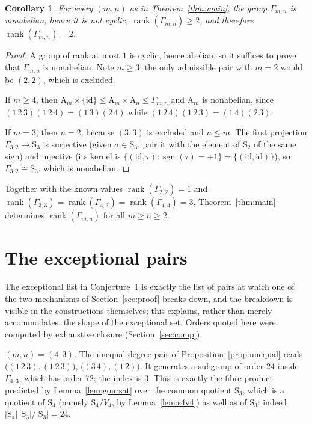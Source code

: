 \documentclass[11pt]{article}
\theoremstyle{plain}
\newtheorem{corollary}[theorem]{Corollary}
\theoremstyle{definition}
\theoremstyle{remark}
\numberwithin{equation}{section}
\newcommand{\Sym}{\mathrm{S}}
\newcommand{\Alt}{\mathrm{A}}
\newcommand{\Gam}{\Gamma}
\DeclareMathOperator{\sgn}{sgn}
\DeclareMathOperator{\rank}{rank}
\begin{document}
\begin{corollary}
\label{cor:rank}
For every $(m,n)$ as in Theorem~\ref{thm:main}, the group $\Gam_{m,n}$ is nonabelian; hence it is
not cyclic, $\rank(\Gam_{m,n}) \ge 2$, and therefore $\rank(\Gam_{m,n}) = 2$.
\end{corollary}

\begin{proof}
A group of rank at most $1$ is cyclic, hence abelian, so it suffices to prove that $\Gam_{m,n}$
is nonabelian. Note $m \ge 3$: the only admissible pair with $m = 2$ would be $(2,2)$, which is
excluded.

If $m \ge 4$, then $\Alt_m \times \{\mathrm{id}\} \le \Alt_m\times\Alt_n \le \Gam_{m,n}$ and
$\Alt_m$ is nonabelian, since $(1\,2\,3)(1\,2\,4) = (1\,3)(2\,4)$ while
$(1\,2\,4)(1\,2\,3) = (1\,4)(2\,3)$.

If $m = 3$, then $n = 2$, because $(3,3)$ is excluded and $n \le m$. The first projection
$\Gam_{3,2} \to \Sym_3$ is surjective (given $\sigma \in \Sym_3$, pair it with the element of
$\Sym_2$ of the same sign) and injective (its kernel is $\{(\mathrm{id},\tau) : \sgn(\tau) = +1\}
= \{(\mathrm{id},\mathrm{id})\}$), so $\Gam_{3,2} \cong \Sym_3$, which is nonabelian.
\end{proof}

Together with the known values $\rank(\Gam_{2,2}) = 1$ and
$\rank(\Gam_{3,3}) = \rank(\Gam_{4,3}) = \rank(\Gam_{4,4}) = 3$, Theorem~\ref{thm:main}
determines $\rank(\Gam_{m,n})$ for all $m \ge n \ge 2$.

\section{The exceptional pairs}
\label{sec:exceptions}

The exceptional list in Conjecture~1 is exactly the list of pairs at which one of the two
mechanisms of Section~\ref{sec:proof} breaks down, and the breakdown is visible in the
constructions themselves; this explains, rather than merely accommodates, the shape of the
exceptional set. Orders quoted here were computed by exhaustive closure
(Section~\ref{sec:comp}).

\emph{$(m,n) = (4,3)$.} The unequal-degree pair of Proposition~\ref{prop:unequal} reads
$\bigl((1\,2\,3),(1\,2\,3)\bigr)$, $\bigl((3\,4),(1\,2)\bigr)$. It generates a subgroup of order
$24$ inside $\Gam_{4,3}$, which has order $72$; the index is $3$. This is exactly the fibre
product predicted by Lemma~\ref{lem:goursat} over the common quotient $\Sym_3$, which is a
quotient of $\Sym_4$ (namely $\Sym_4/V_4$, by Lemma~\ref{lem:s4v4}) as well as of $\Sym_3$:
indeed $|\Sym_4|\,|\Sym_3|/|\Sym_3| = 24$.
\end{document}

